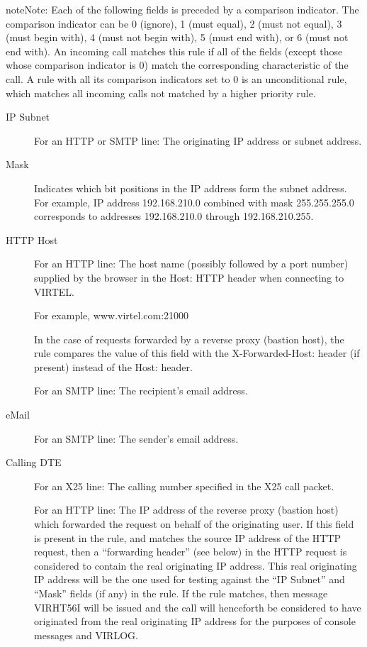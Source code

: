 \documentclass[letterpaper,10pt,english]{sphinxmanual}
\begin{document}
\begin{sphinxadmonition}{note}{Note:}
Each of the following fields is preceded by a comparison indicator. The comparison indicator can be 0 (ignore), 1 (must equal), 2 (must not equal), 3 (must begin with), 4 (must not begin with), 5 (must end with), or 6 (must not end with). An incoming call matches this rule if all of the fields (except those whose comparison indicator is 0) match the corresponding characteristic of the call. A rule with all its comparison indicators set to 0 is an unconditional rule, which matches all incoming calls not matched by a higher priority rule.
\end{sphinxadmonition}
\begin{description}
\item[{IP Subnet}] \leavevmode
For an HTTP or SMTP line: The originating IP address or subnet address.

\item[{Mask}] \leavevmode
Indicates which bit positions in the IP address form the subnet address. For example, IP address 192.168.210.0 combined with mask 255.255.255.0 corresponds to addresses 192.168.210.0 through 192.168.210.255.

\item[{HTTP Host}] \leavevmode
For an HTTP line: The host name (possibly followed by a port number) supplied by the browser in the Host: HTTP header when connecting to VIRTEL.

For example, www.virtel.com:21000

In the case of requests forwarded by a reverse proxy (bastion host), the rule compares the value of this field with the X-Forwarded-Host: header (if present) instead of the Host: header.

For an SMTP line: The recipient’s email address.

\item[{eMail}] \leavevmode
For an SMTP line: The sender’s email address.

\item[{Calling DTE}] \leavevmode
For an X25 line: The calling number specified in the X25 call packet.

For an HTTP line: The IP address of the reverse proxy (bastion host) which forwarded the request on behalf of the originating user. If this field is present in the rule, and matches the source IP address of the HTTP request, then a “forwarding header” (see below) in the HTTP request is considered to contain the real originating IP address. This real originating IP address will be the one used for testing against the “IP Subnet” and “Mask” fields (if any) in the rule. If the rule matches, then message VIRHT56I will be issued and the call will henceforth be considered to have originated from the real originating IP address for the purposes of console messages and VIRLOG.


\end{description}
\end{document}
